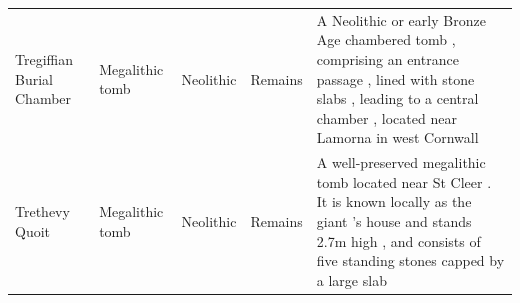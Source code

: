 \documentclass{article}
\begin{document}
\begin{tabular}{lllll}
Tregiffian Burial Chamber & Megalithic tomb & Neolithic & Remains & A Neolithic or early Bronze Age chambered tomb , comprising an entrance passage , lined with stone slabs , leading to a central chamber , located near Lamorna in west Cornwall \\
Trethevy Quoit & Megalithic tomb & Neolithic & Remains & A well-preserved megalithic tomb located near St Cleer . It is known locally as the giant 's house and stands 2.7m high , and consists of five standing stones capped by a large slab \\
\bottomrule
\end{tabular}
\end{document}
